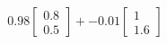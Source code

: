 \documentclass[preview]{standalone}
\begin{document}
\begin{align*}
0.98 \begin{bmatrix} 0.8 \\ 0.5 \end{bmatrix} + -0.01 \begin{bmatrix} 1 \\ 1.6 \end{bmatrix}
\end{align*}
\end{document}
